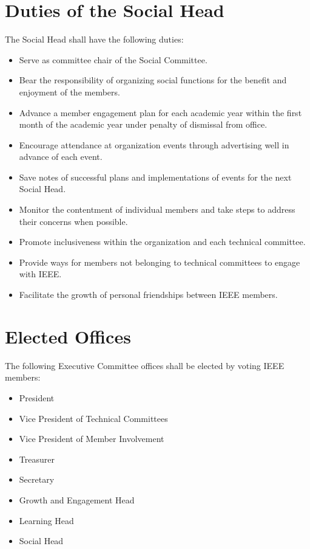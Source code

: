\documentclass[12pt]{constitution}
\begin{document}
\section{Duties of the Social Head}
\label{sec:officer_soc}
The Social Head shall have the following duties:
\begin{itemize}
    \item Serve as committee chair of the Social Committee.
    \item Bear the responsibility of organizing social functions for the benefit and enjoyment of the members.
    \item Advance a member engagement plan for each academic year within the first month of the academic year under penalty of dismissal from office.
    \item Encourage attendance at organization events through advertising well in advance of each event.
    \item Save notes of successful plans and implementations of events for the next Social Head.
    \item Monitor the contentment of individual members and take steps to address their concerns when possible.
    \item Promote inclusiveness within the organization and each technical committee.
    \item Provide ways for members not belonging to technical committees to engage with IEEE.
    \item Facilitate the growth of personal friendships between IEEE members.
\end{itemize}


\label{art:elect}

\section{Elected Offices}
\label{sec:elect_list}
The following Executive Committee offices shall be elected by voting IEEE members:
\begin{itemize}
    \item President
    \item Vice President of Technical Committees
    \item Vice President of Member Involvement
    \item Treasurer
    \item Secretary
    \item Growth and Engagement Head
    \item Learning Head
    \item Social Head
\end{itemize}
\end{document}
